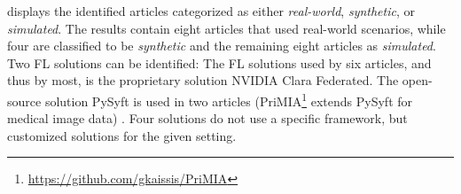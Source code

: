  displays the identified articles categorized as either \textit{real-world}, \textit{synthetic}, or \textit{simulated}. The results contain eight articles that used real-world scenarios, while four are classified to be \textit{synthetic} and the remaining eight articles as \textit{simulated}.
Two FL solutions can be identified: The FL solutions used by six articles, and thus by most, is the proprietary solution NVIDIA Clara Federated\cite{Wang2020AutomatedLearning, Roth2020FederatedImplementation, Sarma2021FederatedSharing, Yang2021FederatedJapan, Li2019Privacy-preservingSegmentation, Flores2021FederatedPatients}. The open-source solution PySyft is used in two articles (PriMIA\footnote{\url{https://github.com/gkaissis/PriMIA}} extends PySyft for medical image data) .%
Four solutions do not use a specific framework, but customized solutions for the given setting.%


